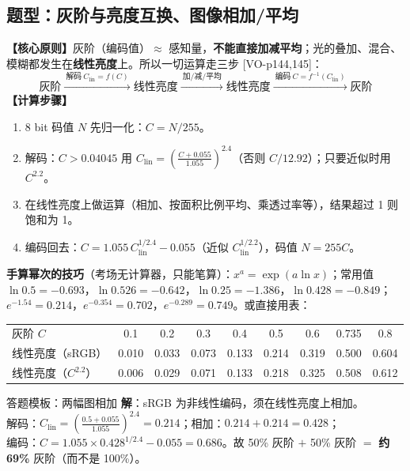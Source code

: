 \subsection{题型：灰阶与亮度互换、图像相加/平均}\label{sec:gammacalc}
\textbf{【核心原则】}灰阶（编码值）$\approx$ 感知量，\textbf{不能直接加减平均}；光的叠加、混合、模糊都发生在\textbf{线性亮度}上。所以一切运算走三步 [VO-p144,145]：
\[
\text{灰阶}\xrightarrow{\ \text{解码}\ C_{\text{lin}}=f(C)\ }\text{线性亮度}\xrightarrow{\ \text{加/减/平均}\ }\text{线性亮度}\xrightarrow{\ \text{编码}\ C=f^{-1}(C_{\text{lin}})\ }\text{灰阶}
\]
\textbf{【计算步骤】}
\begin{enumerate}
\item 8 bit 码值 $N$ 先归一化：$C=N/255$。
\item 解码：$C>0.04045$ 用 $C_{\text{lin}}=\left(\frac{C+0.055}{1.055}\right)^{2.4}$（否则 $C/12.92$）；只要近似时用 $C^{2.2}$。
\item 在线性亮度上做运算（相加、按面积比例平均、乘透过率等），结果超过 1 则饱和为 1。
\item 编码回去：$C=1.055\,C_{\text{lin}}^{1/2.4}-0.055$（近似 $C_{\text{lin}}^{1/2.2}$），码值 $N=255C$。
\end{enumerate}
\textbf{手算幂次的技巧}（考场无计算器，只能笔算）：$x^{a}=\exp(a\ln x)$；常用值 $\ln0.5=-0.693$，$\ln0.526=-0.642$，$\ln0.25=-1.386$，$\ln0.428=-0.849$；$e^{-1.54}=0.214$，$e^{-0.354}=0.702$，$e^{-0.289}=0.749$。或直接用表：
\begin{center}\renewcommand{\arraystretch}{1.25}
\begin{tabular}{@{}lcccccccc@{}}
\toprule
灰阶 $C$ & 0.1 & 0.2 & 0.3 & 0.4 & 0.5 & 0.6 & 0.735 & 0.8 \\
线性亮度（sRGB） & 0.010 & 0.033 & 0.073 & 0.133 & 0.214 & 0.319 & 0.500 & 0.604 \\
线性亮度（$C^{2.2}$） & 0.006 & 0.029 & 0.071 & 0.133 & 0.218 & 0.325 & 0.508 & 0.612 \\
\bottomrule
\end{tabular}
\end{center}

\begin{exam}{答题模板：两幅图相加}
\textbf{解}：sRGB 为非线性编码，须在线性亮度上相加。\\
解码：$C_{\text{lin}}=\left(\frac{0.5+0.055}{1.055}\right)^{2.4}=0.214$；相加：$0.214+0.214=0.428$；\\
编码：$C=1.055\times0.428^{1/2.4}-0.055=0.686$。故 50\% 灰阶 $+$ 50\% 灰阶 $=$ \textbf{约 69\%} 灰阶（而不是 100\%）。
\end{exam}

